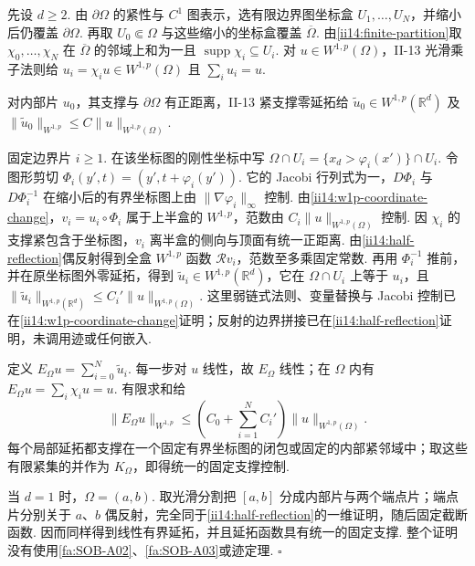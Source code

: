 \begin{FAProof}
先设 \(\displaystyle d\geqslant2\). 由 \(\displaystyle\partial\Omega\) 的紧性与 \(\displaystyle C^1\) 图表示，选有限边界图坐标盒 \(\displaystyle U_1,\dots,U_N\)，并缩小后仍覆盖 \(\displaystyle\partial\Omega\). 再取 \(\displaystyle U_0\Subset\Omega\) 与这些缩小的坐标盒覆盖 \(\displaystyle\overline\Omega\). 由\autoref{ii14:finite-partition}取 \(\displaystyle\chi_0,\dots,\chi_N\) 在 \(\displaystyle\overline\Omega\) 的邻域上和为一且 \(\displaystyle\operatorname{supp}\chi_i\subseteq U_i\). 对 \(\displaystyle u\in W^{1,p}(\Omega)\)，II-13 光滑乘子法则给 \(\displaystyle u_i=\chi_i u\in W^{1,p}(\Omega)\) 且 \(\displaystyle\sum_i u_i=u\).

对内部片 \(\displaystyle u_0\)，其支撑与 \(\displaystyle\partial\Omega\) 有正距离，II-13 紧支撑零延拓给 \(\displaystyle\widetilde u_0\in W^{1,p}(\mathbb R^d)\) 及 \(\displaystyle\|\widetilde u_0\|_{W^{1,p}}\leqslant C\|u\|_{W^{1,p}(\Omega)}\).

固定边界片 \(\displaystyle i\geqslant1\). 在该坐标图的刚性坐标中写 \(\displaystyle\Omega\cap U_i=\{x_d>\varphi_i(x')\}\cap U_i\). 令图形剪切 \(\displaystyle \Phi_i(y',t)=(y',t+\varphi_i(y')).\)
它的 Jacobi 行列式为一，\(\displaystyle D\Phi_i\) 与 \(\displaystyle D\Phi_i^{-1}\) 在缩小后的有界坐标图上由 \(\displaystyle\|\nabla\varphi_i\|_\infty\) 控制. 由\autoref{ii14:w1p-coordinate-change}，\(\displaystyle v_i=u_i\circ\Phi_i\) 属于上半盒的 \(\displaystyle W^{1,p}\)，范数由 \(\displaystyle C_i\|u\|_{W^{1,p}(\Omega)}\) 控制. 因 \(\displaystyle\chi_i\) 的支撑紧包含于坐标图，\(\displaystyle v_i\) 离半盒的侧向与顶面有统一正距离. 由\autoref{ii14:half-reflection}偶反射得到全盒 \(\displaystyle W^{1,p}\) 函数 \(\displaystyle\mathcal Rv_i\)，范数至多乘固定常数. 再用 \(\displaystyle\Phi_i^{-1}\) 推前，并在原坐标图外零延拓，得到 \(\displaystyle\widetilde u_i\in W^{1,p}(\mathbb R^d)\)，它在 \(\displaystyle\Omega\cap U_i\) 上等于 \(\displaystyle u_i\)，且 \(\displaystyle \|\widetilde u_i\|_{W^{1,p}(\mathbb R^d)} \leqslant C_i'\|u\|_{W^{1,p}(\Omega)}.\)
这里弱链式法则、变量替换与 Jacobi 控制已在\autoref{ii14:w1p-coordinate-change}证明；反射的边界拼接已在\autoref{ii14:half-reflection}证明，未调用迹或任何嵌入.

定义 \(\displaystyle E_\Omega u=\sum_{i=0}^N\widetilde u_i\). 每一步对 \(\displaystyle u\) 线性，故 \(\displaystyle E_\Omega\) 线性；在 \(\displaystyle\Omega\) 内有 \(\displaystyle E_\Omega u=\sum_i\chi_i u=u\). 有限求和给
\[
\|E_\Omega u\|_{W^{1,p}}
\leqslant
\left(C_0+\sum_{i=1}^NC_i'\right)
\|u\|_{W^{1,p}(\Omega)}.
\]
每个局部延拓都支撑在一个固定有界坐标图的闭包或固定的内部紧邻域中；取这些有限紧集的并作为 \(\displaystyle K_\Omega\)，即得统一的固定支撑控制.

当 \(\displaystyle d=1\) 时，\(\displaystyle\Omega=(a,b)\). 取光滑分割把 \(\displaystyle[a,b]\) 分成内部片与两个端点片；端点片分别关于 \(\displaystyle a\)、\(\displaystyle b\) 偶反射，完全同于\autoref{ii14:half-reflection}的一维证明，随后固定截断函数. 因而同样得到线性有界延拓，并且延拓函数具有统一的固定支撑. 整个证明没有使用\autoref{fa:SOB-A02}、\autoref{fa:SOB-A03}或迹定理.
\hfill\(\square\)
\end{FAProof}

